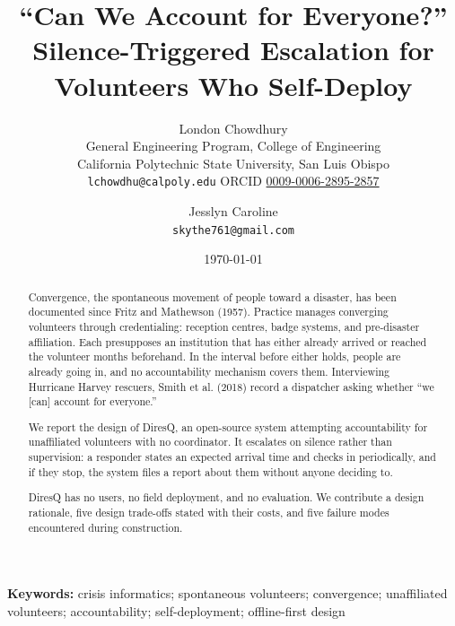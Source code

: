 \documentclass[11pt,a4paper]{article}
\title{``Can We Account for Everyone?''\\[0.3em]
       \large Silence-Triggered Escalation for Volunteers Who Self-Deploy}
\author{London Chowdhury\\[0.35em]
\normalsize General Engineering Program, College of Engineering\\
\normalsize California Polytechnic State University, San Luis Obispo\\
\small\texttt{lchowdhu@calpoly.edu} \quad
ORCID \href{https://orcid.org/0009-0006-2895-2857}{0009-0006-2895-2857}
\and
Jesslyn Caroline\\[0.35em]
\small\texttt{skythe761@gmail.com}}
\date{\today}
\begin{document}
\maketitle

\begin{abstract}
Convergence, the spontaneous movement of people toward a disaster, has
been documented since Fritz and Mathewson (1957). Practice manages
converging volunteers through credentialing: reception centres, badge
systems, and pre-disaster affiliation. Each presupposes an institution
that has either already arrived or reached the volunteer months
beforehand. In the interval before either holds, people are already
going in, and no accountability mechanism covers them. Interviewing
Hurricane Harvey rescuers, Smith et al. (2018) record a dispatcher
asking whether ``we {[}can{]} account for everyone.''

We report the design of DiresQ, an open-source system attempting
accountability for unaffiliated volunteers with no coordinator. It
escalates on silence rather than supervision: a responder states an
expected arrival time and checks in periodically, and if they stop, the
system files a report about them without anyone deciding to.

DiresQ has no users, no field deployment, and no evaluation. We
contribute a design rationale, five design trade-offs stated with their
costs, and five failure modes encountered during construction.
\end{abstract}

\textbf{Keywords:} crisis informatics; spontaneous volunteers; convergence;
unaffiliated volunteers; accountability; self-deployment; offline-first design





\end{document}
